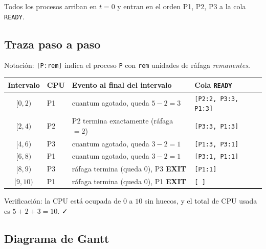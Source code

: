 \documentclass[11pt,a4paper]{article}
\begin{document}
Todos los procesos arriban en $t = 0$ y entran en el orden P1, P2,
P3 a la cola \texttt{READY}.

\subsection*{Traza paso a paso}

Notación: \texttt{[P:rem]} indica el proceso \texttt{P} con
\texttt{rem} unidades de ráfaga \emph{remanentes}.

\begin{center}
\small
\begin{tabular}{@{}clp{4cm}l@{}}
\toprule
Intervalo & CPU & Evento al final del intervalo & Cola \texttt{READY} \\
\midrule
$[0, 2)$  & P1 & cuantum agotado, queda $5-2=3$ & \texttt{[P2:2, P3:3, P1:3]} \\
$[2, 4)$  & P2 & P2 termina exactamente (ráfaga $=2$) & \texttt{[P3:3, P1:3]} \\
$[4, 6)$  & P3 & cuantum agotado, queda $3-2=1$ & \texttt{[P1:3, P3:1]} \\
$[6, 8)$  & P1 & cuantum agotado, queda $3-2=1$ & \texttt{[P3:1, P1:1]} \\
$[8, 9)$  & P3 & ráfaga termina (queda $0$), P3 \textbf{EXIT}  & \texttt{[P1:1]} \\
$[9, 10)$ & P1 & ráfaga termina (queda $0$), P1 \textbf{EXIT}  & \texttt{[\ ]} \\
\bottomrule
\end{tabular}
\end{center}

Verificación: la CPU está ocupada de $0$ a $10$ sin huecos, y el
total de CPU usada es $5 + 2 + 3 = 10$. ✓

\subsection*{Diagrama de Gantt}

\begin{center}
\end{center}
\end{document}
